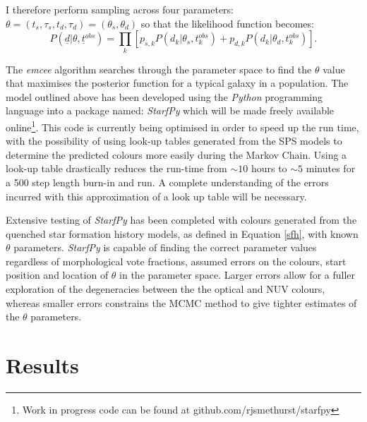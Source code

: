 \documentclass{mn2e}
\begin{document}
I therefore perform sampling across four parameters: $\theta = (t_{s}, \tau_{s}, t_{d}, \tau_{d}) = (\theta_{s}, \theta_{d})$ so that the likelihood function becomes:
\begin{equation}
P(\underline{d}|\theta, \underline{t}^{obs}) = \prod_{k} \left [p_{s, k} P(d_{k}|\theta_{s}, t_{k}^{obs}) + p_{d, k} P(d_{k}|\theta_{d}, t_{k}^{obs}) \right].
\end{equation}



The \emph{emcee} algorithm searches through the parameter space to find the $\theta$ value that maximises the posterior function for a typical galaxy in a population. The model outlined above has been developed using the \emph{Python} programming language into a package named: \emph{StarfPy} which will be made freely available online\footnote{Work in progress code can be found at github.com/rjsmethurst/starfpy}. This code is currently being optimised in order to speed up the run time, with the possibility of using look-up tables generated from the SPS models to determine the predicted colours more easily during the Markov Chain. Using a look-up table drastically reduces the run-time from $\sim 10$ hours to $\sim 5$ minutes for a 500 step length burn-in and run. A complete understanding of the errors incurred with this approximation of a look up table will be necessary. 

Extensive testing of \emph{StarfPy} has been completed with colours generated from the quenched star formation history models, as defined in Equation \ref{sfh}, with known $\theta$ parameters. \emph{StarfPy} is capable of finding the correct parameter values regardless of morphological vote fractions, assumed errors on the colours, start position and location of $\theta$ in the parameter space. Larger errors allow for a fuller exploration of the degeneracies between the the optical and NUV colours, whereas smaller errors constrains the MCMC method to give tighter estimates of the $\theta$ parameters. 

\section{Results}\label{results}
\end{document}
